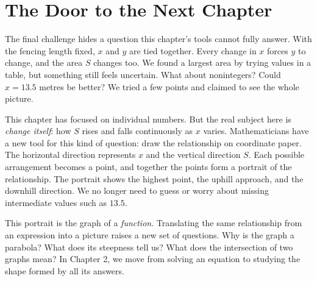 \section*{The Door to the Next Chapter}

The final challenge hides a question this chapter's tools cannot fully answer. With the fencing length fixed, $x$ and $y$ are tied together. Every change in $x$ forces $y$ to change, and the area $S$ changes too. We found a largest area by trying values in a table, but something still feels uncertain. What about nonintegers? Could $x=13.5$ metres be better? We tried a few points and claimed to see the whole picture.

This chapter has focused on individual numbers. But the real subject here is \emph{change itself}: how $S$ rises and falls continuously as $x$ varies. Mathematicians have a new tool for this kind of question: draw the relationship on coordinate paper. The horizontal direction represents $x$ and the vertical direction $S$. Each possible arrangement becomes a point, and together the points form a portrait of the relationship. The portrait shows the highest point, the uphill approach, and the downhill direction. We no longer need to guess or worry about missing intermediate values such as $13.5$.

This portrait is the graph of a \emph{function}. Translating the same relationship from an expression into a picture raises a new set of questions. Why is the graph a parabola? What does its steepness tell us? What does the intersection of two graphs mean? In Chapter 2, we move from solving an equation to studying the shape formed by all its answers.

